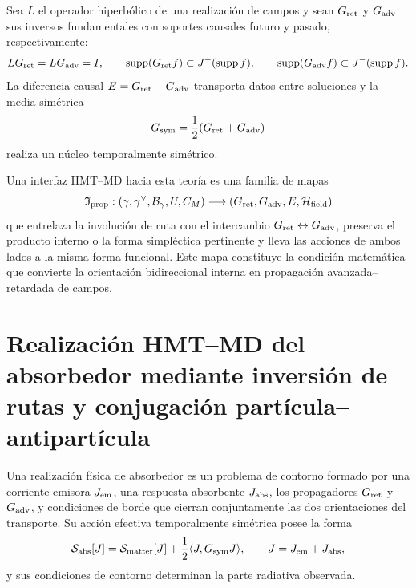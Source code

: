 Sea $L$ el operador hiperbólico de una realización de campos y sean
$G_{\rm ret}$ y $G_{\rm adv}$ sus inversos fundamentales con soportes
causales futuro y pasado, respectivamente:
\begin{equation}
 LG_{\rm ret}=LG_{\rm adv}=I,
 \qquad
 \operatorname{supp}(G_{\rm ret}f)\subset J^+(\operatorname{supp}f),
 \qquad
 \operatorname{supp}(G_{\rm adv}f)\subset J^-(\operatorname{supp}f).
 \label{eq:mt-green-avanzado-retardado}
\end{equation}
La diferencia causal
$E=G_{\rm ret}-G_{\rm adv}$ transporta datos entre soluciones y la media
simétrica
\[
 G_{\rm sym}=\frac12(G_{\rm ret}+G_{\rm adv})
\]
realiza un núcleo temporalmente simétrico.

Una interfaz HMT--MD hacia esta teoría es una familia de mapas
\begin{equation}
 \mathfrak I_{\rm prop}:
 (\gamma,\gamma^\vee,\mathcal B_\gamma,U,C_M)
 \longrightarrow
 (G_{\rm ret},G_{\rm adv},E,\mathcal H_{\rm field})
 \label{eq:mt-interfaz-green}
\end{equation}
que entrelaza la involución de ruta con el intercambio
$G_{\rm ret}\leftrightarrow G_{\rm adv}$, preserva el producto interno o la
forma simpléctica pertinente y lleva las acciones de ambos lados a la misma
forma funcional. Este mapa constituye la condición matemática que convierte
la orientación bidireccional interna en propagación avanzada--retardada de
campos.

\section{Realización HMT–MD del absorbedor mediante inversión de rutas y conjugación partícula–antipartícula}

\begin{definicionnarrativa}[title={Sistema de emisión--absorción bidireccional}]
\label{def:mt-absorbedor}
Una realización física de absorbedor es un problema de contorno formado por
una corriente emisora $J_{\rm em}$, una respuesta absorbente $J_{\rm abs}$,
los propagadores $G_{\rm ret}$ y $G_{\rm adv}$, y condiciones de borde que
cierran conjuntamente las dos orientaciones del transporte. Su acción
efectiva temporalmente simétrica posee la forma
\begin{equation}
 \mathcal S_{\rm abs}[J]
 =\mathcal S_{\rm matter}[J]
 +\frac12\langle J,G_{\rm sym}J\rangle,
 \qquad J=J_{\rm em}+J_{\rm abs},
 \label{eq:mt-accion-absorbedor}
\end{equation}
y sus condiciones de contorno determinan la parte radiativa observada.
\end{definicionnarrativa}

